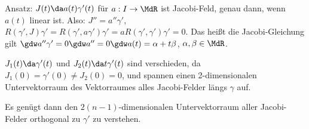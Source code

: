 \documentclass[a4paper,twoside,DIV15,BCOR12mm]{scrbook}
\begin{document}
Ansatz: $J(t)\da a(t)\gamma'(t)$ für $a:I\to \MdR$ ist Jacobi-Feld, genau dann, wenn $a(t)$ linear ist. Also: $J''= a''\gamma'$, $R(\gamma',J)\gamma' = R(\gamma',a \gamma')\gamma' = a R(\gamma',\gamma')\gamma'= 0$. Das heißt die Jacobi-Gleichung gilt $\gdw a''\gamma'=0 \gdw a''=0 \gdw a(t) = \alpha + t\beta$, $\alpha, \beta\in \MdR$.

\begin{folgerung*}
$J_1(t) \da \gamma'(t)$ und $J_2(t) \da t \gamma'(t)$ sind verschieden, da $J_1(0) = \gamma'(0) \ne J_2(0) = 0$, und spannen einen 2-dimensionalen Untervektorraum des Vektorraumes alles Jacobi-Felder längs $\gamma$ auf.

Es genügt dann den $2(n-1)$-dimensionalen Untervektorraum aller Jacobi-Felder orthogonal zu $\gamma'$ zu verstehen.
\end{folgerung*}
\end{document}
